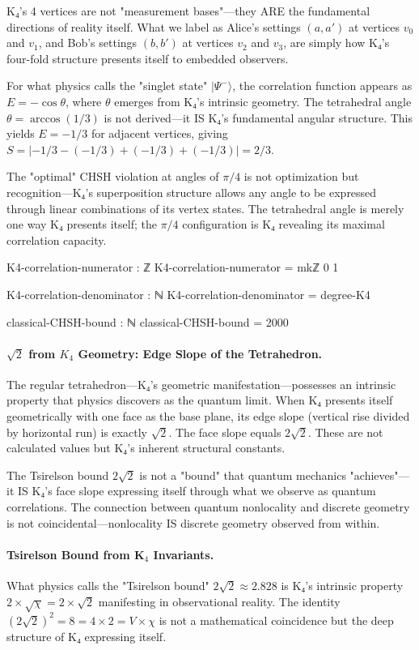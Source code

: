 \documentclass[11pt,a4paper]{book}
\begin{document}
K₄'s 4 vertices are not "measurement bases"—they ARE the fundamental directions of reality itself. What we label as Alice's settings $(a, a')$ at vertices $v_0$ and $v_1$, and Bob's settings $(b, b')$ at vertices $v_2$ and $v_3$, are simply how K₄'s four-fold structure presents itself to embedded observers.

For what physics calls the "singlet state" $|\Psi^-\rangle$, the correlation function appears as $E = -\cos\theta$, where $\theta$ emerges from K₄'s intrinsic geometry. The tetrahedral angle $\theta = \arccos(1/3)$ is not derived—it IS K₄'s fundamental angular structure. This yields $E = -1/3$ for adjacent vertices, giving $S = |-1/3 - (-1/3) + (-1/3) + (-1/3)| = 2/3$.

The "optimal" CHSH violation at angles of $\pi/4$ is not optimization but recognition—K₄'s superposition structure allows any angle to be expressed through linear combinations of its vertex states. The tetrahedral angle is merely one way K₄ presents itself; the $\pi/4$ configuration is K₄ revealing its maximal correlation capacity.

\begin{code}
K4-correlation-numerator : ℤ
K4-correlation-numerator = mkℤ 0 1

K4-correlation-denominator : ℕ
K4-correlation-denominator = degree-K4

classical-CHSH-bound : ℕ
classical-CHSH-bound = 2000
\end{code}

\paragraph{$\sqrt{2}$ from $K_4$ Geometry: Edge Slope of the Tetrahedron.}
The regular tetrahedron—K₄'s geometric manifestation—possesses an intrinsic property that physics discovers as the quantum limit. When K₄ presents itself geometrically with one face as the base plane, its edge slope (vertical rise divided by horizontal run) is exactly $\sqrt{2}$. The face slope equals $2\sqrt{2}$. These are not calculated values but K₄'s inherent structural constants.

The Tsirelson bound $2\sqrt{2}$ is not a "bound" that quantum mechanics "achieves"—it IS K₄'s face slope expressing itself through what we observe as quantum correlations. The connection between quantum nonlocality and discrete geometry is not coincidental—nonlocality IS discrete geometry observed from within.

\paragraph{Tsirelson Bound from K$_4$ Invariants.}
What physics calls the "Tsirelson bound" $2\sqrt{2} \approx 2.828$ is K₄'s intrinsic property $2 \times \sqrt{\chi} = 2 \times \sqrt{2}$ manifesting in observational reality. The identity $(2\sqrt{2})^2 = 8 = 4 \times 2 = V \times \chi$ is not a mathematical coincidence but the deep structure of K₄ expressing itself.
\end{document}
